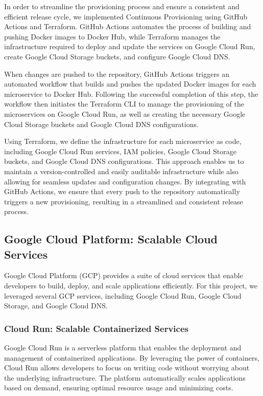 \documentclass[a4paper,fleqn]{cas-dc}
\begin{document}
In order to streamline the provisioning process and ensure a consistent and efficient release cycle, we implemented Continuous Provisioning using GitHub Actions and Terraform. GitHub Actions automates the process of building and pushing Docker images to Docker Hub, while Terraform manages the infrastructure required to deploy and update the services on Google Cloud Run, create Google Cloud Storage buckets, and configure Google Cloud DNS.

When changes are pushed to the repository, GitHub Actions triggers an automated workflow that builds and pushes the updated Docker images for each microservice to Docker Hub. Following the successful completion of this step, the workflow then initiates the Terraform CLI to manage the provisioning of the microservices on Google Cloud Run, as well as creating the necessary Google Cloud Storage buckets and Google Cloud DNS configurations.

Using Terraform, we define the infrastructure for each microservice as code, including Google Cloud Run services, IAM policies, Google Cloud Storage buckets, and Google Cloud DNS configurations. This approach enables us to maintain a version-controlled and easily auditable infrastructure while also allowing for seamless updates and configuration changes. By integrating with GitHub Actions, we ensure that every push to the repository automatically triggers a new provisioning, resulting in a streamlined and consistent release process.

\subsection{Google Cloud Platform: Scalable Cloud Services}

Google Cloud Platform (GCP) provides a suite of cloud services that enable developers to build, deploy, and scale applications efficiently. For this project, we leveraged several GCP services, including Google Cloud Run, Google Cloud Storage, and Google Cloud DNS.

\subsubsection{Cloud Run: Scalable Containerized Services}

Google Cloud Run is a serverless platform that enables the deployment and management of containerized applications. By leveraging the power of containers, Cloud Run allows developers to focus on writing code without worrying about the underlying infrastructure. The platform automatically scales applications based on demand, ensuring optimal resource usage and minimizing costs.
\end{document}
